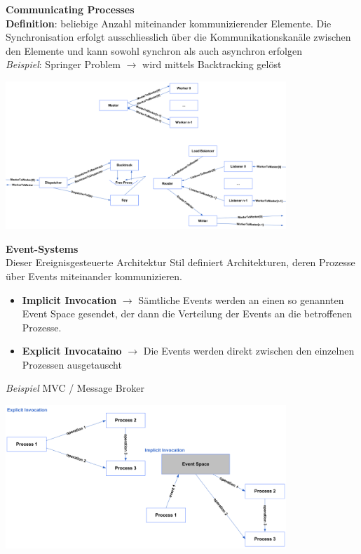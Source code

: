 \documentclass{report}
\newenvironment{Figure}
	{\par\medskip\noindent\minipage{\linewidth}}
	{\endminipage\par\medskip}
\theoremstyle{definition}
\theoremstyle{example}
\begin{document}
\textbf{Communicating Processes}\\
\textbf{Definition}: beliebige Anzahl miteinander kommunizierender Elemente. Die Synchronisation erfolgt ausschliesslich über die Kommunikationskanäle zwischen den Elemente und kann sowohl synchron als auch asynchron erfolgen\\
\textit{Beispiel}: Springer Problem $\rightarrow$ wird mittels Backtracking gelöst

\begin{Figure}
\centering
\includegraphics[width=400px]{img/CommunicatingProcessesBeispiel.png}
	\label{fig:Beispiel eines communicating Processes}
\end{Figure}

\textbf{Event-Systems}\\
Dieser Ereignisgesteuerte Architektur Stil definiert Architekturen, deren Prozesse über Events miteinander kommunizieren.
\begin{itemize}
	\item \textbf{Implicit Invocation} $\rightarrow$ Sämtliche Events werden an einen so genannten Event Space gesendet, der dann die Verteilung der Events an die betroffenen Prozesse.
	\item \textbf{Explicit Invocataino} $\rightarrow$ Die Events werden direkt zwischen den einzelnen Prozessen ausgetauscht
\end{itemize}
\textit{Beispiel} MVC / Message Broker

\begin{Figure}
\centering
\includegraphics[width=400px]{img/EventSystems.png}
	\label{fig:Event Systems}
\end{Figure}
\end{document}
